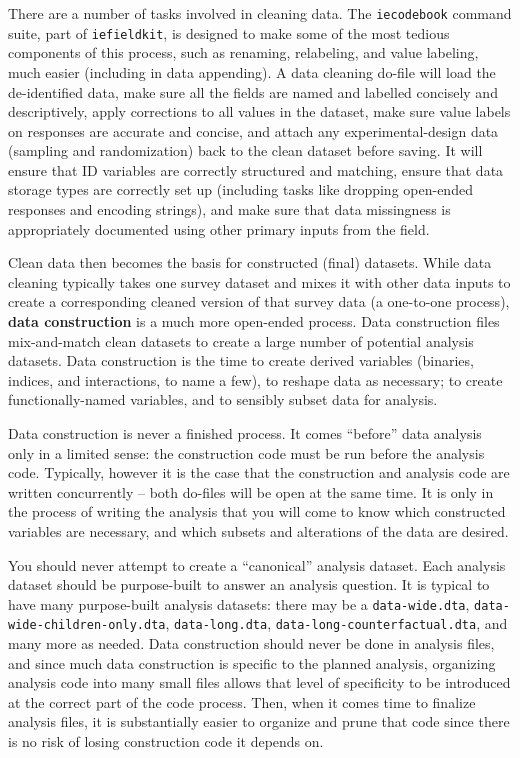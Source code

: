 There are a number of tasks involved in cleaning data.
The \texttt{iecodebook} command suite, part of \texttt{iefieldkit},
is designed to make some of the most tedious components of this process,
such as renaming, relabeling, and value labeling,
much easier (including in data appending).
A data cleaning do-file will load the de-identified data,
make sure all the fields are named and labelled concisely and descriptively,
apply corrections to all values in the dataset,
make sure value labels on responses are accurate and concise,
and attach any experimental-design data (sampling and randomization)
back to the clean dataset before saving.
It will ensure that ID variables are correctly structured and matching,
ensure that data storage types are correctly set up
(including tasks like dropping open-ended responses and encoding strings),
and make sure that data missingness is appropriately documented
using other primary inputs from the field.

Clean data then becomes the basis for constructed (final) datasets.
While data cleaning typically takes one survey dataset
and mixes it with other data inputs to create a corresponding
cleaned version of that survey data (a one-to-one process),
\textbf{data construction} is a much more open-ended process.
Data construction files mix-and-match clean datasets
to create a large number of potential analysis datasets.
Data construction is the time to create derived variables
(binaries, indices, and interactions, to name a few),
to reshape data as necessary;
to create functionally-named variables,
and to sensibly subset data for analysis.

Data construction is never a finished process.
It comes ``before'' data analysis only in a limited sense:
the construction code must be run before the analysis code.
Typically, however it is the case that the construction and analysis code
are written concurrently -- both do-files will be open at the same time.
It is only in the process of writing the analysis
that you will come to know which constructed variables are necessary,
and which subsets and alterations of the data are desired.

You should never attempt to create a ``canonical'' analysis dataset.
Each analysis dataset should be purpose-built to answer an analysis question.
It is typical to have many purpose-built analysis datasets:
there may be a \texttt{data-wide.dta},
\texttt{data-wide-children-only.dta}, \texttt{data-long.dta},
\texttt{data-long-counterfactual.dta}, and many more as needed.
Data construction should never be done in analysis files,
and since much data construction is specific to the planned analysis,
organizing analysis code into many small files allows that level of specificity
to be introduced at the correct part of the code process.
Then, when it comes time to finalize analysis files,
it is substantially easier to organize and prune that code
since there is no risk of losing construction code it depends on.

